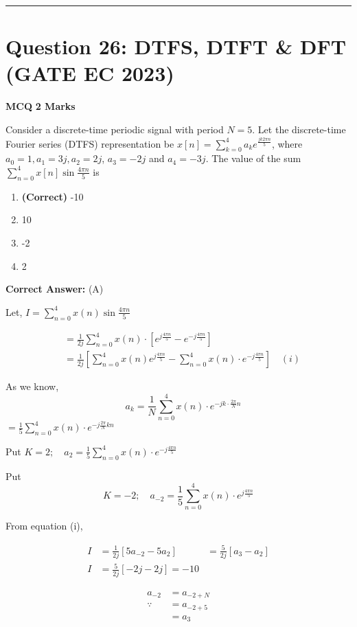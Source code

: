 \documentclass[11pt,a4paper]{article}
\begin{document}
\vspace{1.5em}
\hrule
\vspace{1.5em}

\section*{Question 26: DTFS, DTFT \& DFT (GATE EC 2023)}
\noindent \textbf{\color{primary}MCQ} \hfill \textbf{\color{secondary}2 Marks}


\noindent Consider a discrete-time periodic signal with period $N=5$. Let the discrete-time Fourier series (DTFS) representation be $x[n]=\sum_{k=0}^{4} a_{k} e^{\frac{j k 2 \pi n}{5}}$, where $a_{0}=1, a_{1}=3 j, a_{2}=2 j$, $a_{3}=-2 j$ and $a_{4}=-3 j$. The value of the sum $\sum_{n=0}^{4} x[n] \sin \frac{4 \pi n}{5}$ is


\begin{enumerate}[label=(\Alph*)]
    \item \textbf{(Correct)} -10
    \item 10
    \item -2
    \item 2
\end{enumerate}

\noindent \textbf{Correct Answer:} (A)

\begin{tcolorbox}[solbox, title=Detailed Solution -- Question 26]
Let, $I=\sum_{n=0}^{4} x(n) \sin \frac{4 \pi n}{5}$

\[
\begin{aligned}
& =\frac{1}{2 j} \sum_{n=0}^{4} x(n) \cdot\left[e^{j \frac{4 \pi n}{5}}-e^{-j \frac{4 \pi n}{5}}\right] \\
& =\frac{1}{2 j}\left[\sum_{n=0}^{4} x(n) e^{j \frac{4 \pi n}{5}}-\sum_{n=0}^{4} x(n) \cdot e^{-j \frac{4 \pi n}{5}}\right]  \quad (i)
\end{aligned}
\]

As we know, 
\[
\quad a_{k}=\frac{1}{N} \sum_{n=0}^{4} x(n) \cdot e^{-j k \cdot \frac{2 \pi}{N} n}
\]
$=\frac{1}{5} \sum_{n=0}^{4} x(n) \cdot e^{-j \frac{2 \pi}{N} k n}$

Put $K=2 ; \quad a_{2}=\frac{1}{5} \sum_{n=0}^{4} x(n) \cdot e^{-j \frac{4 \pi n}{5}}$

Put 
\[
K=-2 ; \quad a_{-2}=\frac{1}{5} \sum_{n=0}^{4} x(n) \cdot e^{j \frac{4 \pi n}{5}}
\]

From equation (i), 

\[
\begin{aligned}
I&=\frac{1}{2 j}\left[5 a_{-2}-5 a_{2}\right]
& =\frac{5}{2 j}\left[a_{3}-a_{2}\right] \\
I & =\frac{5}{2 j}[-2 j-2 j]=-10
\end{aligned}
\]

\[
\begin{array}{rl}
a_{-2} & =a_{-2+N} \\
\because \quad & =a_{-2+5} \\
& =a_{3}
\end{array}
\]
\end{tcolorbox}
\end{document}
